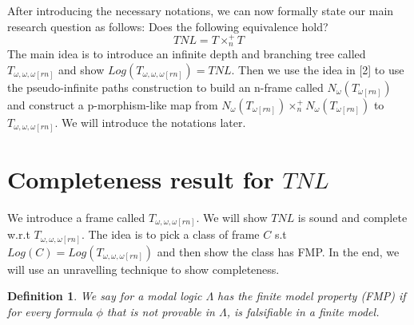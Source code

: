 \documentclass[12pt, a4paper]{scrartcl}
\newtheorem{definition}{Definition}[subsection]
\begin{document}
After introducing the necessary notations, we can now formally state our main research question as follows:
Does the following equivalence hold?
$$\mathit{TNL} = T \times^+_n T$$
The main idea is to introduce an infinite depth and branching tree called $T_{\omega,\omega,\omega[rn]}$ and show $Log(T_{\omega,\omega,\omega[rn]}) = \mathit{TNL}$.
Then we use the idea in [2] to use the pseudo-infinite paths construction to build an n-frame called $N_\omega(T_{\omega[rn]})$ and construct a p-morphism-like map 
from $N_\omega(T_{\omega[rn]}) \times^+_n N_\omega(T_{\omega[rn]})$ to $T_{\omega,\omega,\omega[rn]}$. We will introduce the notations later.

\clearpage

\section{Completeness result for $\mathit{TNL}$}

We introduce a frame called $T_{\omega, \omega, \omega[rn]}$. We will show $\mathit{TNL}$ is sound and complete w.r.t $T_{\omega, \omega, \omega[rn]}$.
The idea is to pick a class of frame $C$ s.t $Log(C) = Log(T_{\omega, \omega, \omega[rn]})$ and then show the class has FMP.
In the end, we will use an unravelling technique to show completeness. 

\begin{definition}
    We say for a modal logic $\Lambda$ has the finite model property (FMP) if for every formula $\phi$ that is not provable in $\Lambda$,
    is falsifiable in a finite model.
        
\end{definition}
\end{document}
